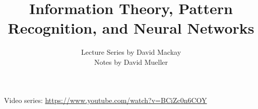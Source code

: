 \documentclass[13pt, letterpaper]{article}
\title{Information Theory, Pattern Recognition, and Neural Networks}
\author{ Lecture Series by David Mackay \\ Notes by David Mueller}
\date{}
\theoremstyle{definition}
\begin{document}
\maketitle
Video series: \url{https://www.youtube.com/watch?v=BCiZc0n6COY}

\tableofcontents


%
%
%
\end{document}
